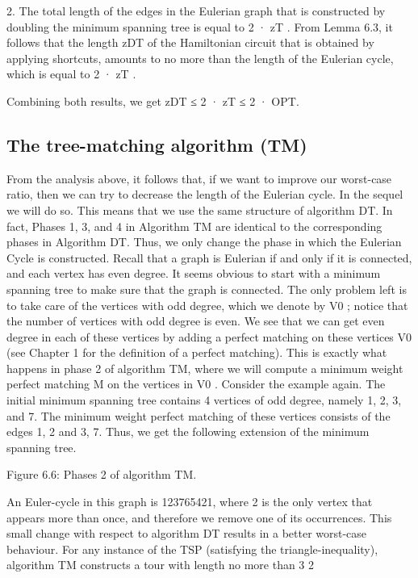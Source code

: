 2. The total length of the edges in the Eulerian graph that is constructed by doubling the minimum
spanning tree is equal to 2 · zT . From Lemma 6.3, it follows that the length zDT of the Hamiltonian
circuit that is obtained by applying shortcuts, amounts to no more than the length of the Eulerian
cycle, which is equal to 2 · zT .

Combining both results, we get zDT ≤ 2 · zT ≤ 2 · OPT.

\subsection{The tree-matching algorithm (TM)}

From the analysis above, it follows that, if we want to improve our worst-case ratio, then we can try to
decrease the length of the Eulerian cycle. In the sequel we will do so. This means that we use the same
structure of algorithm DT. In fact, Phases 1, 3, and 4 in Algorithm TM are identical to the corresponding
phases in Algorithm DT. Thus, we only change the phase in which the Eulerian Cycle is constructed.
Recall that a graph is Eulerian if and only if it is connected, and each vertex has even degree. It seems
obvious to start with a minimum spanning tree to make sure that the graph is connected. The only
problem left is to take care of the vertices with odd degree, which we denote by V0 ; notice that the
number of vertices with odd degree is even. We see that we can get even degree in each of these vertices
by adding a perfect matching on these vertices V0 (see Chapter 1 for the definition of a perfect matching).
This is exactly what happens in phase 2 of algorithm TM, where we will compute a minimum weight
perfect matching M on the vertices in V0 .
Consider the example again. The initial minimum spanning tree contains 4 vertices of odd degree, namely
1, 2, 3, and 7. The minimum weight perfect matching of these vertices consists of the edges {1, 2} and
{3, 7}. Thus, we get the following extension of the minimum spanning tree.

Figure 6.6: Phases 2 of algorithm TM.

An Euler-cycle in this graph is 123765421, where 2 is the only vertex that appears more than once, and
therefore we remove one of its occurrences.
This small change with respect to algorithm DT results in a better worst-case behaviour. For any instance
of the TSP (satisfying the triangle-inequality), algorithm TM constructs a tour with length no more than
3
2

